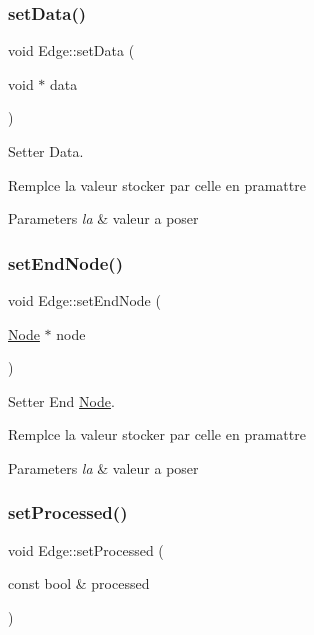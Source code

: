 \subsubsection{\texorpdfstring{set\+Data()}{setData()}}
{\footnotesize\ttfamily void Edge\+::set\+Data (\begin{DoxyParamCaption}\item[{void $\ast$}]{data }\end{DoxyParamCaption})}



Setter Data. 

Remplce la valeur stocker par celle en pramattre


\begin{DoxyParams}{Parameters}
{\em la} & valeur a poser \\
\hline
\end{DoxyParams}
\mbox{\label{class_edge_a5d73c839006c47140491c76dcca2739e}} 
\subsubsection{\texorpdfstring{set\+End\+Node()}{setEndNode()}}
{\footnotesize\ttfamily void Edge\+::set\+End\+Node (\begin{DoxyParamCaption}\item[{\mbox{\hyperlink{class_node}{Node}} $\ast$}]{node }\end{DoxyParamCaption})}



Setter End \mbox{\hyperlink{class_node}{Node}}. 

Remplce la valeur stocker par celle en pramattre


\begin{DoxyParams}{Parameters}
{\em la} & valeur a poser \\
\hline
\end{DoxyParams}
\mbox{\label{class_edge_a33bc7cc18ba5f4bea6ba562722d70192}} 
\subsubsection{\texorpdfstring{set\+Processed()}{setProcessed()}}
{\footnotesize\ttfamily void Edge\+::set\+Processed (\begin{DoxyParamCaption}\item[{const bool \&}]{processed }\end{DoxyParamCaption})}



